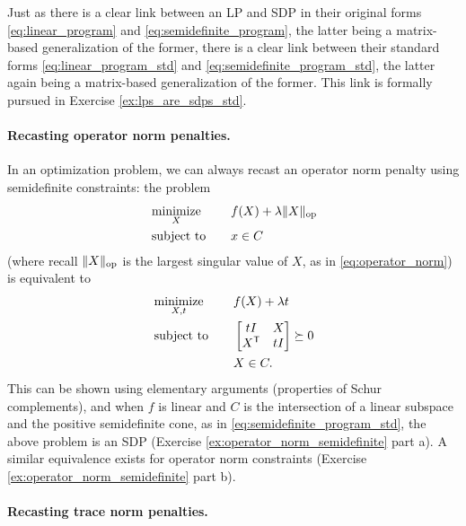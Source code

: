 Just as there is a clear link between an LP and SDP in their original forms
\eqref{eq:linear_program} and \eqref{eq:semidefinite_program}, the latter 
being a matrix-based generalization of the former, there is a clear link
between their standard forms \eqref{eq:linear_program_std} and
\eqref{eq:semidefinite_program_std}, the latter again being a matrix-based 
generalization of the former. This link is formally pursued in Exercise
\ref{ex:lps_are_sdps_std}.  

\paragraph{Recasting operator norm penalties.}

In an optimization problem, we can always recast an operator norm penalty using    
semidefinite constraints: the problem 
\begin{alignat*}{2}
&\operatorname*{minimize}_X \quad && f(X) + \lambda \|X\|_{\mathrm{op}} \\
&\operatorname{subject\,\,to} \quad && x \in C
\end{alignat*}
(where recall $\|X\|_{\mathrm{op}}$ is the largest singular value of $X$, as in
\eqref{eq:operator_norm}) is equivalent to  
\begin{alignat*}{2}
&\operatorname*{minimize}_{X,t} \quad && f(X) + \lambda t \\
&\operatorname{subject\,\,to} \quad && \begin{bmatrix} t I & X \\ 
X^{\mathsf{T}} & t I \end{bmatrix} \succeq 0 \\
& && X \in C.
\end{alignat*}
This can be shown using elementary arguments (properties of Schur complements),
and when $f$ is linear and $C$ is the intersection of a linear subspace and the
positive semidefinite cone, as in \eqref{eq:semidefinite_program_std}, the above
problem is an SDP (Exercise \ref{ex:operator_norm_semidefinite} part a). A
similar equivalence exists for operator norm constraints (Exercise
\ref{ex:operator_norm_semidefinite} part b).  

\paragraph{Recasting trace norm penalties.}

